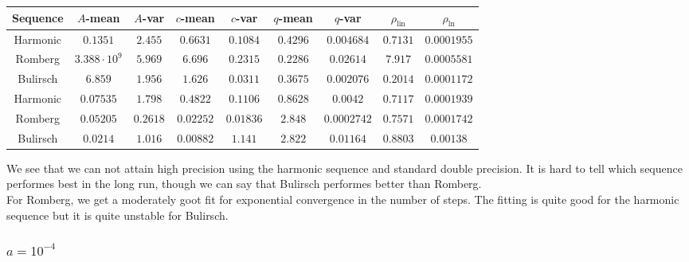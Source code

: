 \begin{table}[H]
    \centering
    \small
    \begin{tabular}{c||c|c|c|c|c|c|c|c}
Sequence & \(A\)-mean & \(A\)-var & \(c\)-mean & \(c\)-var & \(q\)-mean & \(q\)-var & \(\rho_{\operatorname{lin}}\) & \(\rho_{\ln}\)\\\hline
\rowcolor{yellow}
Harmonic & \(0.1351\) & \(2.455\) & \(0.6631\) & \(0.1084\) & \(0.4296\) & \(0.004684\) & \(0.7131\) & \(0.0001955\) \\
\rowcolor{red}
Romberg & \(3.388\cdot 10^9\) & \(5.969\) & \(6.696\) & \(0.2315\) & \(0.2286\) & \(0.02614\) & \(7.917\) & \(0.0005581\) \\
\rowcolor{yellow}
Bulirsch & \(6.859\) & \(1.956\) & \(1.626\) & \(0.0311\) & \(0.3675\) & \(0.002076\) & \(0.2014\) & \(0.0001172\) \\
\rowcolor{yellow}
Harmonic & \(0.07535\) & \(1.798\) & \(0.4822\) & \(0.1106\) & \(0.8628\) & \(0.0042\) & \(0.7117\) & \(0.0001939\) \\
\rowcolor{yellow}
Romberg & \(0.05205\) & \(0.2618\) & \(0.02252\) & \(0.01836\) & \(2.848\) & \(0.0002742\) & \(0.7571\) & \(0.0001742\) \\
\rowcolor{red}
Bulirsch & \(0.0214\) & \(1.016\) & \(0.00882\) & \(1.141\) & \(2.822\) & \(0.01164\) & \(0.8803\) & \(0.00138\) \\
    \end{tabular}
    \label{tab:my_label}
\end{table}

We see that we can not attain high precision using the harmonic sequence and standard double precision. It is hard to tell which sequence performes best in the long run, though we can say that Bulirsch performes better than Romberg.\\

For Romberg, we get a moderately goot fit for exponential convergence in the number of steps. The fitting is quite good for the harmonic sequence but it is quite unstable for Bulirsch.

\subsubsection{\(a = 10^{-4}\)}

